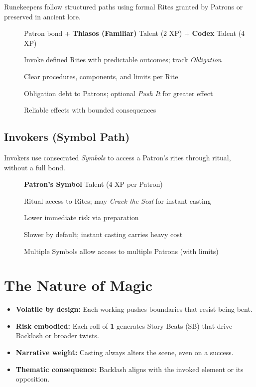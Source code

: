 Runekeepers follow structured paths using formal Rites granted by Patrons or preserved in ancient lore.

\begin{description}
\item[]  Patron bond + \textbf{Thiasos (Familiar)} Talent (2 XP) + \textbf{Codex} Talent (4 XP)
\item[] Invoke defined Rites with predictable outcomes; track \textit{Obligation}
\item[] Clear procedures, components, and limits per Rite
\item[] Obligation debt to Patrons; optional \textit{Push It} for greater effect 
\item[] Reliable effects with bounded consequences
\end{description}

\subsection{Invokers (Symbol Path)}
\label{subsec:invokers}

Invokers use consecrated \emph{Symbols} to access a Patron's rites through ritual, without a full bond.

\begin{description}
\item[]  \textbf{Patron's Symbol} Talent (4 XP per Patron)
\item[] Ritual access to Rites; may \textit{Crack the Seal} for instant casting
\item[] Lower immediate risk via preparation
\item[] Slower by default; instant casting carries heavy cost
\item[] Multiple Symbols allow access to multiple Patrons (with limits)
\end{description}

\section{The Nature of Magic}
\label{sec:nature-of-magic}

\begin{itemize}
\item \textbf{Volatile by design:} Each working pushes boundaries that resist being bent. 
\item \textbf{Risk embodied:} Each roll of \textbf{1} generates Story Beats (SB) that drive Backlash or broader twists. 
\item \textbf{Narrative weight:} Casting always alters the scene, even on a success. 
\item \textbf{Thematic consequence:} Backlash aligns with the invoked element or its opposition. 
\end{itemize}

